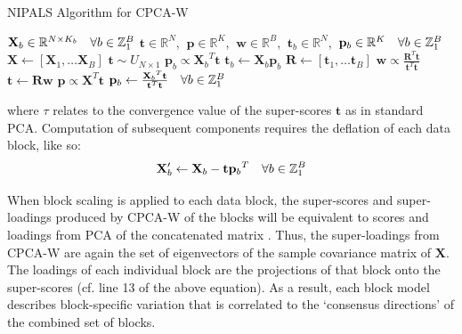 \begin{algorithm}[H]
\caption{NIPALS Algorithm for CPCA-W}
\label{algorithm.3.4}
\begin{algorithmic}[1]
\REQUIRE $\mathbf{X}_b \in \mathbb{R}^{N \times K_b}
          \quad \forall b \in \mathbb{Z}_{1}^{B}$
\ENSURE $\mathbf{t} \in \mathbb{R}^N$,%
      $\:\mathbf{p} \in \mathbb{R}^K$,%
      $\:\mathbf{w} \in \mathbb{R}^B$,%
      $\:\mathbf{t}_b \in \mathbb{R}^N$,%
      $\:\mathbf{p}_b \in \mathbb{R}^K \quad \forall b \in \mathbb{Z}_{1}^{B}$
\STATE $\mathbf{X} \gets
        [\mathbf{X}_1, \dots \mathbf{X}_B]$
\STATE $\mathbf{t} \sim U_{N \times 1}$ 
\REPEAT
    \STATE $\mathbf{p}_b \propto {\mathbf{X}_b}^T \mathbf{t}$
    \STATE $\mathbf{t}_b \gets \mathbf{X}_b \mathbf{p}_b$
  \ENDFOR
  \STATE $\mathbf{R} \gets [\mathbf{t}_1, \dots \mathbf{t}_B]$
  \STATE $\mathbf{w} \propto \tfrac{\mathbf{R}^T \mathbf{t}}
                                   {\mathbf{t}^T \mathbf{t}}$
  \STATE $\mathbf{t} \gets \mathbf{R} \mathbf{w}$
\UNTIL{$\tau < \varepsilon$}
\STATE $\mathbf{p} \propto \mathbf{X}^T \mathbf{t}$
\STATE $\mathbf{p}_b \gets \tfrac{{\mathbf{X}_b}^T \mathbf{t}}
                                 {\mathbf{t}^T \mathbf{t}}
        \quad \forall b \in \mathbb{Z}_{1}^{B}$
\end{algorithmic}
\end{algorithm}

\begin{doublespace}
where $\tau$ relates to the convergence value of the super-scores
$\mathbf{t}$ as in standard PCA. Computation of subsequent components requires
the deflation of each data block, like so:
\begin{equation}
\mathbf{X}_b' \gets \mathbf{X}_b - \mathbf{t} {\mathbf{p}_b}^T
 \quad \forall b \in \mathbb{Z}_{1}^{B}
\end{equation}

When block scaling is applied to each data block, the super-scores and
super-loadings produced by CPCA-W of the blocks will be equivalent to scores
and loadings from PCA of the concatenated matrix
\cite{westerhuis:jchemo1998,smilde:jchemo2003}. Thus, the super-loadings
from CPCA-W are again the set of eigenvectors of the sample covariance matrix
of $\mathbf{X}$. The loadings of each individual block are the projections of
that block onto the super-scores (cf. line 13 of the above equation). As a
result, each block model describes block-specific variation that is correlated
to the `consensus directions' of the combined set of blocks.
\end{doublespace}

